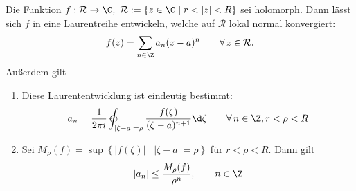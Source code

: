 		\begin{thmn}[Laurententwicklung]\label{3.3.4}
			Die Funktion $ f: \mathcal{R} \to \C,\ \mathcal{R} := \{z \in \C \mid r < |z| < R\} $ sei holomorph. Dann lässt sich $f$ in eine Laurentreihe entwickeln, welche auf $\mathcal{R}$ lokal normal konvergiert: 
			\[ f(z) = \sum_{n \in \Z} a_n (z-a)^n \qquad \forall\, z \in \mathcal{R}. \]
			Außerdem gilt
			\begin{enumerate}[label={\roman*})]
				\item Diese Laurententwicklung ist eindeutig bestimmt:
				\[ a_n = \frac{1}{2\pi i} \varointctrclockwise_{|\zeta - a| = \rho} \frac{f(\zeta)}{(\zeta - a)^{n+1}}\d\zeta \qquad \forall\, n \in \Z, r < \rho < R \]
				\item Sei $ M_\rho (f) = \sup \left\{|f(\zeta)| \mid |\zeta-a| = \rho \right\} $ für $ r < \rho < R. $ Dann gilt 
				\[ |a_n| \leq \frac{M_\rho(f)}{\rho^n}, \qquad n \in \Z \]
			\end{enumerate}
		\end{thmn}